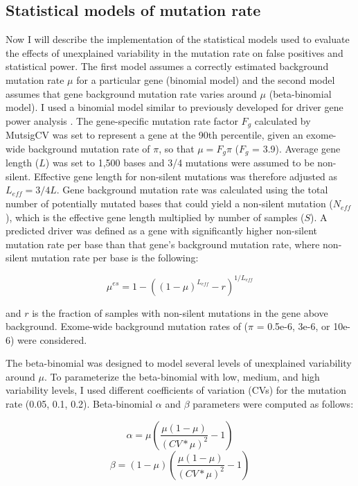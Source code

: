 \subsection{Statistical models of mutation rate}
\label{sec:stat_models}

Now I will describe the implementation of the statistical models used to evaluate the effects of unexplained variability in the mutation rate on false positives and statistical power. The first model assumes a correctly estimated background mutation rate $\mu$ for a particular gene (binomial model) and the second model assumes that gene background mutation rate varies around $\mu$ (beta-binomial model). I used a binomial model similar to previously developed for driver gene power analysis \cite{RN14}. The gene-specific mutation rate factor $F_g$ calculated by MutsigCV \cite{RN14} was set to represent a gene at the 90th percentile, given an exome-wide background mutation rate of $\pi$, so that $\mu=F_g\pi$ ($F_g$ = 3.9). Average gene length ($L$) was set to 1,500 bases and 3/4 mutations were assumed to be non-silent. Effective gene length for non-silent mutations was therefore adjusted as $L_{eff}=3/4L$. Gene background mutation rate was calculated using the total number of potentially mutated bases that could yield a non-silent mutation ($N_{eff}$), which is the effective gene length multiplied by number of samples ($S$). A predicted driver was defined as a gene with significantly higher non-silent mutation rate per base than that gene's background mutation rate, where non-silent mutation rate per base is the following:

\begin{equation}
\mu^{es} = 1 - ((1-\mu)^{L_{eff}}-r)^{1/L_{eff}}
\end{equation}

and $r$ is the fraction of samples with non-silent mutations in the gene above background. Exome-wide background mutation rates of ($\pi$ = 0.5e-6, 3e-6, or 10e-6) were considered.

The beta-binomial was designed to model several levels of unexplained variability around $\mu$. To parameterize the beta-binomial with low, medium, and high variability levels, I used different coefficients of variation (CVs) for the mutation rate (0.05, 0.1, 0.2). Beta-binomial $\alpha$ and $\beta$ parameters were computed as follows:

\begin{equation}
\label{eq:alpha}
\alpha = \mu\left(\frac{\mu(1-\mu)}{(CV*\mu)^2}-1\right)
\end{equation}
\begin{equation}
\label{eq:beta}
\beta = (1-\mu)\left(\frac{\mu(1-\mu)}{(CV*\mu)^2}-1\right)
\end{equation}

